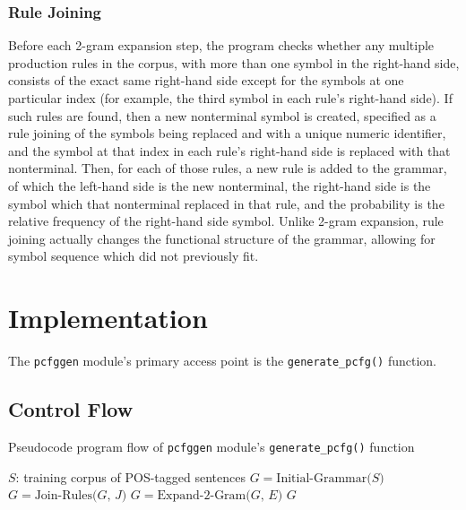 \documentclass[paper=a4, fontsize=11pt]{scrartcl} %
\numberwithin{equation}{section} %
\numberwithin{figure}{section} %
\numberwithin{table}{section} %
\begin{document}
\subsubsection{Rule Joining}

Before each 2-gram expansion step, the program checks whether any multiple production rules in the corpus, with more than one symbol in the right-hand side, consists of the exact same right-hand side except for the symbols at one particular index (for example, the third symbol in each rule's right-hand side). If such rules are found, then a new nonterminal symbol is created, specified as a rule joining of the symbols being replaced and with a unique numeric identifier, and the symbol at that index in each rule's right-hand side is replaced with that nonterminal. Then, for each of those rules, a new rule is added to the grammar, of which the left-hand side is the new nonterminal, the right-hand side is the symbol which that nonterminal replaced in that rule, and the probability is the relative frequency of the right-hand side symbol. Unlike 2-gram expansion, rule joining actually changes the functional structure of the grammar, allowing for symbol sequence which did not previously fit.


\section{Implementation}

The \texttt{pcfggen} module's primary access point is the \texttt{generate\_pcfg()} function.

\subsection{Control Flow}

\begin{algorithm}
\caption{Pseudocode program flow of \texttt{pcfggen} module's \texttt{generate\_pcfg()} function}
\begin{algorithmic}
 \Comment $S$: training corpus of POS-tagged sentences
\State $G = \text{Initial-Grammar($S$)}$
\Loop
{}
\State $G = \text{Join-Rules($G$, $J$)}$
\EndWhile
{}
\State $G = \text{Expand-2-Gram($G$, $E$)}$
\Else
\State \Return $G$
\EndIf
\EndLoop
\EndFunction
\end{algorithmic}
\end{algorithm}
\end{document}
